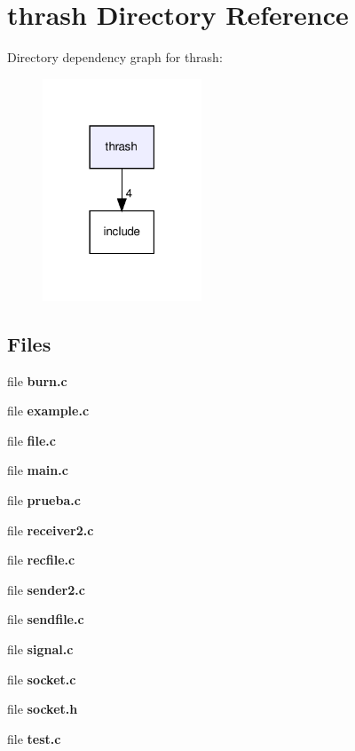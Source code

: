 \section{thrash Directory Reference}
\label{dir_c379293c836f304268e92f9c3073abed}
Directory dependency graph for thrash\+:
\nopagebreak
\begin{figure}[H]
\begin{center}
\leavevmode
\includegraphics[width=134pt]{dir_c379293c836f304268e92f9c3073abed_dep}
\end{center}
\end{figure}
\subsection*{Files}
\begin{DoxyCompactItemize}
\item 
file \textbf{ burn.\+c}
\item 
file \textbf{ example.\+c}
\item 
file \textbf{ file.\+c}
\item 
file \textbf{ main.\+c}
\item 
file \textbf{ prueba.\+c}
\item 
file \textbf{ receiver2.\+c}
\item 
file \textbf{ recfile.\+c}
\item 
file \textbf{ sender2.\+c}
\item 
file \textbf{ sendfile.\+c}
\item 
file \textbf{ signal.\+c}
\item 
file \textbf{ socket.\+c}
\item 
file \textbf{ socket.\+h}
\item 
file \textbf{ test.\+c}
\end{DoxyCompactItemize}
